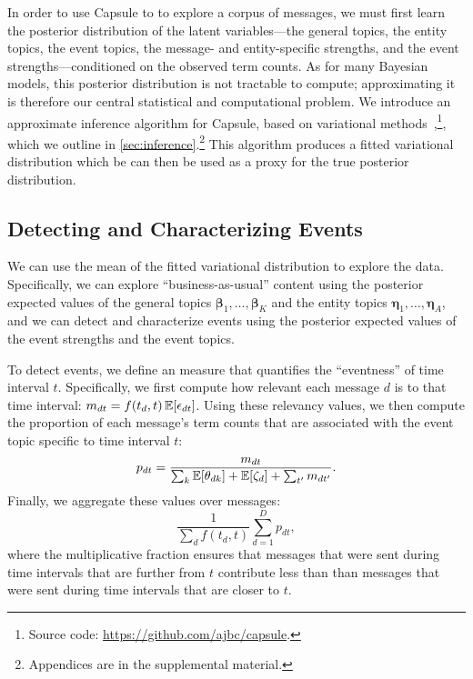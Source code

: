 In order to use Capsule to to explore a corpus of messages, we must
first learn the posterior distribution of the latent variables---the
general topics, the entity topics, the event topics, the message- and
entity-specific strengths, and the event strengths---conditioned on
the observed term counts. As for many Bayesian models, this posterior
distribution is not tractable to compute; approximating it is
therefore our central statistical and computational problem. We
introduce an approximate inference algorithm for Capsule, based on
variational methods~\cite{Jordan:1999},\footnote{Source code:
  \url{https://github.com/ajbc/capsule}.}, which we outline in
\cref{sec:inference}.\footnote{Appendices are in the supplemental
  material.} This algorithm produces a fitted variational distribution
which be can then be used as a proxy for the true posterior
distribution.

\subsection{Detecting and Characterizing Events}
\label{sec:detecting}

We can use the mean of the fitted variational distribution to explore
the data. Specifically, we can explore ``business-as-usual'' content
using the posterior expected values of the general topics
$\mathbold{\beta}_1, \ldots, \mathbold{\beta}_K$ and the entity topics
$\mathbold{\eta}_1, \ldots, \mathbold{\eta}_A$, and we can detect and
characterize events using the posterior expected values of the event
strengths and the event topics.

To detect events, we define an measure that quantifies the
``eventness'' of time interval $t$. Specifically, we first compute how
relevant each message $d$ is to that time interval: $m_{dt} = f(t_d,
t)\,\mathbb{E}[\epsilon_{dt}]$. Using these relevancy values, we then compute
the proportion of each message's term counts that are associated with
the event topic specific to time interval $t$:
\begin{equation}
  p_{dt}= \frac{m_{dt}}{\sum_{k}
    \mathbb{E}[\theta_{dk}] + \mathbb{E}[\zeta_d] +
    \sum_{t'} m_{dt'}}.
\end{equation}
Finally, we aggregate these values over messages:
\begin{equation}
  \frac{1}{\sum_{d} f(t_d, t)}\sum_{d=1}^D p_{dt},
  \label{eq:eventness}
\end{equation}
where the multiplicative fraction ensures that messages that were sent
during time intervals that are further from $t$ contribute less than
than messages that were sent during time intervals that are closer to
$t$.

